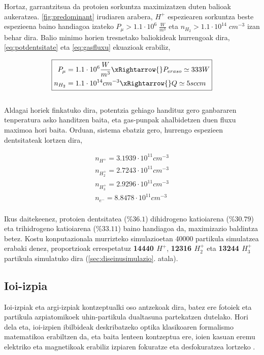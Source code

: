 \documentclass[12pt]{article}
\numberwithin{figure}{section}
\numberwithin{equation}{section}
\begin{document}
Hortaz, garrantzitsua da protoien sorkuntza maximizatzen duten balioak aukeratzea. \ref{fig:predominant} irudiaren arabera, $H^+$ espeziearen sorkuntza beste espezieena baino handiagoa izateko $P_\mu > \num{1.1}\cdot10^6 \; \frac{W}{m^3}$ eta $n_{H_2}>\num{1.1}\cdot10^{14}\;cm^{-3}$ izan behar dira. Balio minimo horien tresnetako baliokideak hurrengoak dira, \eqref{eq:potdentsitate} eta \eqref{eq:gasfluxu}  ekuazioak erabiliz,

\begin{equation}
\boxed{
    \begin{align}
        P_\mu &= \num{1.1}\cdot10^6 \frac{W}{m^3} \xRightarrow{} P_{eraso} \simeq 333 W \\
        n_{H_2} &= \num{1.1}\cdot10^{14}cm^{-3} \xRightarrow{} Q \simeq 5 sccm
    \end{align}
}
\end{equation}\\

Aldagai horiek finkatuko dira, potentzia gehiago handituz gero ganbararen tenperatura asko handitzen baita, eta gas-punpak ahalbidetzen duen fluxu maximoa hori baita. Orduan, sistema ebatziz gero, hurrengo espezieen dentsitateak lortzen dira,

\begin{equation}
\boxed{
    \begin{align}
        n_{H^+} = \num{3.1939} \cdot 10^{11} cm^{-3} \\
        n_{H_2^+} = \num{2.7243} \cdot 10^{11} cm^{-3} \\
        n_{H_3^+} = \num{2.9296} \cdot 10^{11} cm^{-3}\\
        n_{e^-} = \num{8.8478} \cdot 10^{11} cm^{-3}
    \end{align}
}
\end{equation}\\

Ikus daitekeenez, protoien dentsitatea ($\% \num{36.1}$) dihidrogeno katioiarena ($\% \num{30.79}$) eta trihidrogeno katioiarena ($\% \num{33.11}$) baino handiagoa da, maximizazio baldintza betez. Kostu konputazionala murrizteko simulazioetan 40000 partikula simulatzea erabaki denez, proportzioak errespetatuz \textbf{14440 $H^+$}, \textbf{12316 $H_2^+$} eta \textbf{13244 $H_3^+$} partikula simulatuko dira (\ref{sec:diseinusimulazio}. atala).

\subsection{Ioi-izpia}
Ioi-izpiak eta argi-izpiak kontzeptualki oso antzekoak dira, batez ere fotoiek eta partikula azpiatomikoek uhin-partikula dualtasuna partekatzen dutelako. Hori dela eta, ioi-izpien ibilbideak deskribatzeko optika klasikoaren formalismo matematikoa erabiltzen da, eta baita lenteen kontzeptua ere, ioien kasuan eremu elektriko eta magnetikoak erabiliz izpiaren fokuratze eta desfokuratzea lortzeko \cite{rose_geometrical_2012}. \\
\end{document}
